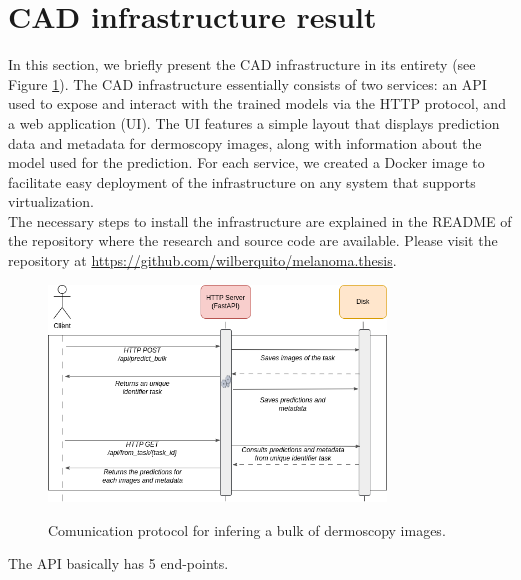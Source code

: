 \section{CAD infrastructure result}

In this section, we briefly present the CAD infrastructure in its entirety (see
Figure \ref{fig:background-task}). The CAD infrastructure essentially consists
of two services: an API used to expose and interact with the trained models via
the HTTP protocol, and a web application (UI). The UI features a simple layout
that displays prediction data and metadata for dermoscopy images, along with
information about the model used for the prediction. For each service, we
created a Docker image to facilitate easy deployment of the infrastructure on
any system that supports virtualization. \\

The necessary steps to install the infrastructure are explained in the README
of the repository where the research and source code are available. Please
visit the repository at
\href{https://github.com/wilberquito/melanoma.thesis}{https://github.com/wilberquito/melanoma.thesis}.


\begin{figure}[H]
  \centering
  \includegraphics[width=0.8\textwidth]{imatges/cad-result/BackgroundTask.drawio.png}
  \caption{Comunication protocol for infering a bulk of dermoscopy images.}
  {\label{fig:background-task}}
\end{figure}

The API basically has 5 end-points.

